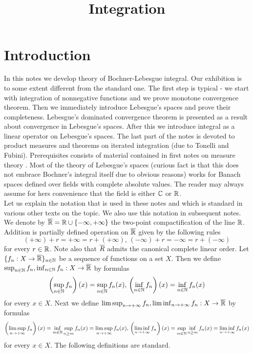 



\title{Integration}
\date{}
\maketitle

\section{Introduction}
In this notes we develop theory of Bochner-Lebesgue integral. Our exhibition is to some extent different from the standard one. The first step is typical - we start with integration of nonnegative functions and we prove monotone convergence theorem. Then we immediately introduce Lebesgue's spaces and prove their completeness. Lebesgue's dominated convergence theorem is presented as a result about convergence in Lebesgue's spaces. After this we introduce integral as a linear operator on Lebesgue's spaces. The last part of the notes is devoted to product measures and theorems on iterated integration (due to Tonelli and Fubini). Prerequisites consists of material contained in first notes on measure theory \cite{Introduction_to_measure_theory}. Most of the theory of Lebesgue's spaces (curious fact is that this does not embrace Bochner's integral itself due to obvious reasons) works for Banach spaces defined over fields with complete absolute values. The reader may always assume for hers convenience that the field is either ${\mathbb C}$ or ${\mathbb R}$.\\
Let us explain the notation that is used in these notes and which is standard in various other texts on the topic. We also use this notation in subsequent notes. We denote by $\overline{{\mathbb R}}={\mathbb R}\cup \{-\infty,+\infty\}$ the two-point compactification of the line ${\mathbb R}$. Addition is partially defined operation on $\overline{{\mathbb R}}$ given by the following rules
$$(+\infty)+r=+\infty=r+(+\infty),\,(-\infty)+r=-\infty=r+(-\infty)$$
for every $r\in {\mathbb R}$. Note also that $\overline{R}$ admits the canonical complete linear order. Let $\{f_n:X\rightarrow \overline{{\mathbb R}}\}_{n\in {\mathbb N}}$ be a sequence of functions on a set $X$. Then we define $\sup_{n\in {\mathbb N}}f_n,\inf_{n\in {\mathbb N}}f_n:X\rightarrow \overline{{\mathbb R}}$ by formulas
$$\left(\sup_{n\in {\mathbb N}}f_n\right)(x) = \sup_{n\in {\mathbb N}}f_n(x),\,\left(\inf_{n\in {\mathbb N}}f_n\right)(x) = \inf_{n\in {\mathbb N}}f_n(x)$$
for every $x\in X$. Next we define $\limsup_{n\rightarrow +\infty}f_n,\liminf_{n\rightarrow +\infty}f_n:X\rightarrow \overline{{\mathbb R}}$ by formulas
$$\left(\limsup_{n\rightarrow +\infty}f_n\right)(x) =\inf_{m\in {\mathbb N}}\sup_{n\geq m}f_n(x) = \limsup_{n\rightarrow +\infty}f_n(x),\,\left(\liminf_{n\rightarrow +\infty}f_n\right)(x) = \sup_{m\in {\mathbb N}}\inf_{n\geq m}f_n(x) = \liminf_{n\rightarrow +\infty}f_n(x)$$
for every $x\in X$. The following definitions are standard.

